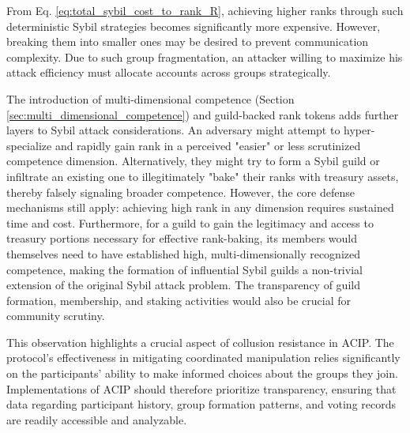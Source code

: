 \documentclass{article}
\begin{document}
\begin{CJK}{UTF8}{gbsn}
        From Eq. \ref{eq:total_sybil_cost_to_rank_R}, achieving higher ranks through such deterministic Sybil strategies becomes significantly more expensive. However, breaking them into smaller ones may be desired to prevent communication complexity. Due to such group fragmentation, an attacker willing to maximize his attack efficiency must allocate accounts across groups strategically.

            {{The introduction of multi-dimensional competence (Section \ref{sec:multi_dimensional_competence}) and guild-backed rank tokens adds further layers to Sybil attack considerations. An adversary might attempt to hyper-specialize and rapidly gain rank in a perceived "easier" or less scrutinized competence dimension. Alternatively, they might try to form a Sybil guild or infiltrate an existing one to illegitimately "bake" their ranks with treasury assets, thereby falsely signaling broader competence. However, the core defense mechanisms still apply: achieving high rank in any dimension requires sustained time and cost. Furthermore, for a guild to gain the legitimacy and access to treasury portions necessary for effective rank-baking, its members would themselves need to have established high, multi-dimensionally recognized competence, making the formation of influential Sybil guilds a non-trivial extension of the original Sybil attack problem. The transparency of guild formation, membership, and staking activities would also be crucial for community scrutiny.}}

            {{This observation highlights a crucial aspect of collusion resistance in ACIP. The protocol's effectiveness in mitigating coordinated manipulation relies significantly on the participants' ability to make informed choices about the groups they join. Implementations of ACIP should therefore prioritize transparency, ensuring that data regarding participant history, group formation patterns, and voting records are readily accessible and analyzable.}}


\end{CJK}
\end{document}
